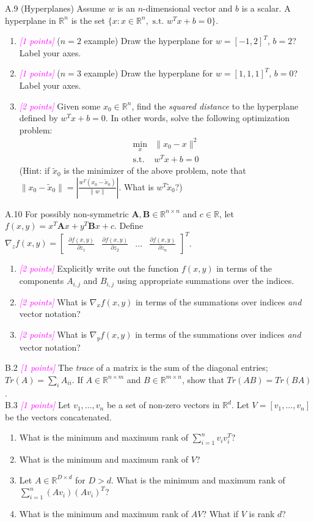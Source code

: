 \documentclass{article}
\newcommand{\field}[1]{\mathbb{#1}}
\newcommand{\1}{\mathbf{1}}
\newcommand{\R}{\field{R}} %
\newcommand{\mat}[1]{\boldsymbol{#1}} %
\newcommand{\points}[1]{\small\textcolor{magenta}{\emph{[#1 points]}} \normalsize}
\begin{document}
A.9 (Hyperplanes) Assume $w$ is an $n$-dimensional vector and $b$ is a scalar. A hyperplane in $\R^n$ is the set $\{x : x\in \R^n,\text{ s.t. } w^T x + b = 0\}$.
\begin{enumerate}
	\item \points{1} ($n=2$ example) Draw the hyperplane for $w=[-1,2]^T$, $b=2$? Label your axes.
	\item \points{1} ($n=3$ example) Draw the hyperplane for $w=[1,1,1]^T$, $b=0$? Label your axes.
	\item \points{2} Given some $x_0 \in \R^n$, find the \emph{squared distance} to the hyperplane defined by $w^T x + b=0$.
	In other words, solve the following optimization problem:
	\begin{align*}
	\min_x& \|x_0 - x \|^2\\
	\text{s.t. }&w^Tx +b = 0
	\end{align*}
	(Hint: if $\widetilde{x}_0$ is the minimizer of the above problem, note that $\| x_0 - \widetilde{x}_0 \| = | \frac{w^T(x_0 - \widetilde{x}_0)}{\|w\|} |$. What is $w^T \widetilde{x}_0$?)
\end{enumerate} 

A.10 For possibly non-symmetric $\mat{A}, \mat{B} \in \R^{n \times n}$ and $c \in \R$, let $f(x, y) = x^T \mat{A} x + y^T \mat{B} x + c$. Define $\nabla_z f(x,y) = \begin{bmatrix} \frac{\partial f(x,y)}{\partial z_1} & \frac{\partial f(x,y)}{\partial z_2} & \dots & \frac{\partial f(x,y)}{\partial z_n} \end{bmatrix}^T$.  
\begin{enumerate}
	\item \points{2} Explicitly write out the function $f(x, y)$ in terms of the components $A_{i,j}$ and $B_{i,j}$ using appropriate summations over the indices.
	\item \points{2} What is $\nabla_x f(x,y)$ in terms of the summations over indices \emph{and} vector notation?
	\item \points{2} What is $\nabla_y f(x,y)$ in terms of the summations over indices \emph{and} vector notation?
\end{enumerate}

B.2 \points{1} The \textit{trace} of a matrix is the sum of the diagonal entries; $Tr(A) = \sum_i A_{ii}$. If $A\in\mathbb{R}^{n\times m}$ and $B\in\mathbb{R}^{m\times n}$, show that $Tr(AB) = Tr(BA)$.\\

B.3 \points{1} Let $v_1,\dots,v_n$ be a set of non-zero vectors in $\mathbb{R}^d$. Let $V = [v_1,\dots,v_n]$ be the vectors concatenated. 
    \begin{enumerate}
        \item What is the minimum and maximum rank of $\sum_{i=1}^n v_i v_i^T$?
        \item What is the minimum and maximum rank of $V$?
        \item Let $A \in \mathbb{R}^{D \times d}$ for $D > d$. What is the minimum and maximum rank of $\sum_{i=1}^n (A v_i) (A v_i)^T$?
        \item What is the minimum and maximum rank of $AV$? What if $V$ is rank $d$?
    \end{enumerate}
\end{document}

